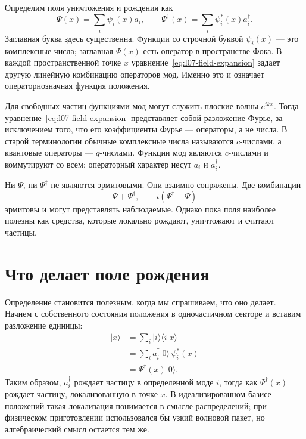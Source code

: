 Определим поля уничтожения и рождения как
\begin{equation}
\Psi(x)=\sum_i \psi_i(x)a_i,
\qquad
\Psi^\dagger(x)=\sum_i \psi_i^*(x)a_i^\dagger.
\label{eq:l07-field-expansion}
\end{equation}
Заглавная буква здесь существенна. Функции со строчной буквой \(\psi_i(x)\) — это комплексные числа; заглавная \(\Psi(x)\) есть оператор в пространстве Фока. В каждой пространственной точке \(x\) уравнение~\eqref{eq:l07-field-expansion} задает другую линейную комбинацию операторов мод. Именно это и означает операторнозначная функция положения.

Для свободных частиц функциями мод могут служить плоские волны \(e^{ikx}\). Тогда уравнение~\eqref{eq:l07-field-expansion} представляет собой разложение Фурье, за исключением того, что его коэффициенты Фурье — операторы, а не числа. В старой терминологии обычные комплексные числа называются \(c\)-числами, а квантовые операторы — \(q\)-числами. Функции мод являются \(c\)-числами и коммутируют со всем; операторный характер несут \(a_i\) и \(a_i^\dagger\).

Ни \(\Psi\), ни \(\Psi^\dagger\) не являются эрмитовыми. Они взаимно сопряжены. Две комбинации
\begin{equation}
\Psi+\Psi^\dagger,
\qquad
i(\Psi^\dagger-\Psi)
\label{eq:l07-hermitian-combinations}
\end{equation}
эрмитовы и могут представлять наблюдаемые. Однако пока поля наиболее полезны как средства, которые локально рождают, уничтожают и считают частицы.

\begin{classroomqa}
\end{classroomqa}

\section{Что делает поле рождения}

Определение становится полезным, когда мы спрашиваем, что оно делает. Начнем с собственного состояния положения в одночастичном секторе и вставим разложение единицы:
\begin{align}
|x\rangle
&=\sum_i |i\rangle\langle i|x\rangle \\
&=\sum_i a_i^\dagger|0\rangle\,\psi_i^*(x) \\
&=\Psi^\dagger(x)|0\rangle.
\label{eq:l07-local-creation}
\end{align}
Таким образом, \(a_i^\dagger\) рождает частицу в определенной моде \(i\), тогда как \(\Psi^\dagger(x)\) рождает частицу, локализованную в точке \(x\). В идеализированном базисе положений такая локализация понимается в смысле распределений; при физическом приготовлении использовался бы узкий волновой пакет, но алгебраический смысл остается тем же.

